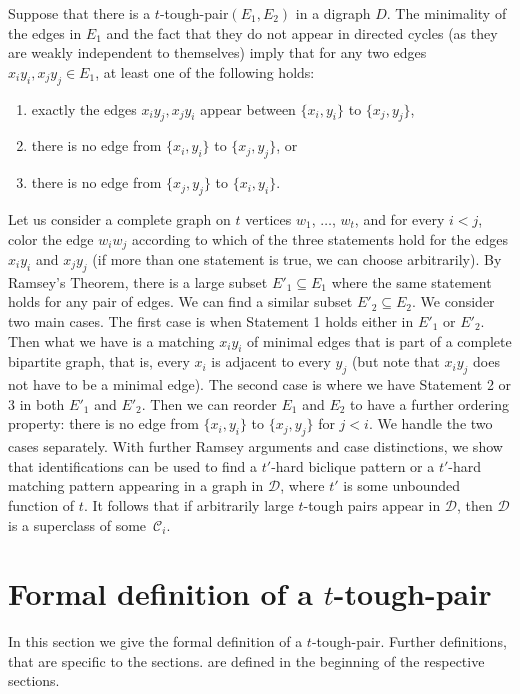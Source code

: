 \documentclass[a4paper,11pt]{article}
\newcommand{\calD}{\mathcal{D}}
\theoremstyle{plain}
\newtheorem{identification rule}{Identification Rule}
\theoremstyle{definition}
\theoremstyle{remark}
\newcommand{\toughpair}{tough-pair}
\begin{document}
 Suppose that there is a $t$-\toughpair $(E_1,E_2)$ in a digraph $D$.  The minimality of the edges in $E_1$ and the fact that they do not appear in directed cycles (as they are weakly independent to themselves) imply that for any two edges $x_iy_i, x_jy_j\in E_1$, at least one of the following holds:
 \begin{enumerate}
   \item exactly the edges $x_iy_j, x_jy_i$ appear between $\{x_i,y_i\}$ to $\{x_j,y_j\}$,
   \item there is no edge from $\{x_i,y_i\}$ to $\{x_j,y_j\}$, or
   \item there is no edge from $\{x_j,y_j\}$ to $\{x_i,y_i\}$.
   \end{enumerate}
   Let us consider a complete graph on $t$ vertices $w_1$, $\dots$, $w_t$, and for every $i<j$, color the edge $w_iw_j$ according to which of the three statements hold for the edges $x_iy_i$ and $x_jy_j$ (if more than one statement is true, we can choose arbitrarily). By Ramsey's Theorem, there is a large subset $E'_1\subseteq E_1$ where the same statement holds for any pair of edges. We can find a similar subset $E'_2\subseteq E_2$. We consider two main cases. The first case is when Statement 1 holds either in $E'_1$ or $E'_2$. Then what we have is a matching $x_iy_i$ of minimal edges that is part of a complete bipartite graph, that is, every $x_i$ is adjacent to every $y_j$ (but note that $x_iy_j$ does not have to be a minimal edge). The second case is where we have Statement 2 or 3 in both $E'_1$ and $E'_2$. Then we can reorder $E_1$ and $E_2$ to have a further ordering property: there is no edge from $\{x_i,y_i\}$ to $\{x_j,y_j\}$ for $j<i$. We handle the two cases separately. With further Ramsey arguments and case distinctions, we show that identifications can be used to find a $t'$-hard biclique pattern or a $t'$-hard matching pattern appearing in a graph in $\calD$, where $t'$ is some unbounded function of $t$. It follows that if arbitrarily large $t$-tough pairs appear in $\calD$, then $\calD$ is a superclass of some~$\mathcal{C}_i$.


\section{Formal definition of a $t$-\toughpair}\label{sec:prelims}
In this section we give the formal definition of a $t$-\toughpair.
Further definitions, that are specific to the sections. are defined in the beginning of the respective sections.
\end{document}
